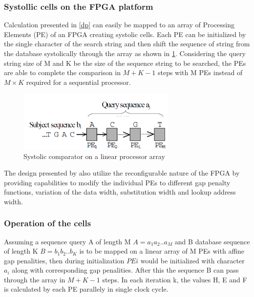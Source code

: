 \documentclass[12pt,twoside]{article}
\begin{document}
\subsubsection{Systollic cells on the FPGA platform}

Calculation presented in \cref{dp} can easily be mapped to an array of Processing Elements (PE) of an FPGA creating systolic cells.
Each PE can be initialized by the single character of the search string and then shift the sequence of string from the database systolically
through the array as shown in \cref{fig:systollicarray}. Considering the query string size of M and K be the size of the sequence string to be
searched, the PEs are able to complete the comparison in $ M + K-1 $ steps with M PEs instead of $ M \times K $ required for a sequential processor.

\begin{figure}%
    \centering
    \includegraphics[width=0.7\textwidth]{fig/systollicarray}
    \caption{Systolic comparator on a linear processor array \cite[Figure 2]{oliver_hyper_2005}}
    \label{fig:systollicarray}
\end{figure}

The design presented by \textcite{oliver_hyper_2005} also utilize the reconfigurable nature of the FPGA by providing capabilities to modify the 
individual PEs to different gap penalty functions, variation of the data width, substitution width and lookup address width. 

\subsubsection{Operation of the cells}

Assuming a sequence query A of length M $ A = a_1a_2 .. a_M $ and B database sequence of length K $B = b_1b_2 .. b_K $ is to be mapped on a linear array of
M PEs with affine gap penalities, then during initialization $ PE i $ would be initialized with character $ a_i $ along with corresponding
gap penalities. After this the sequence B can pass through the array in $M+K-1$ steps. In each iteration k, the values H, E and F is calculated by
each PE parallely in single clock cycle. 
\end{document}
